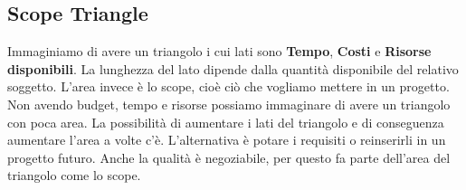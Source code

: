 \subsection{Scope Triangle}

Immaginiamo di avere un triangolo i cui lati sono \textbf{Tempo}, \textbf{Costi} e \textbf{Risorse disponibili}. La lunghezza del lato dipende dalla quantità disponibile del relativo soggetto. L'area invece è lo scope, cioè ciò che vogliamo mettere in un progetto. Non avendo budget, tempo e risorse possiamo immaginare di avere un triangolo con poca area.\newline
La possibilità di aumentare i lati del triangolo e di conseguenza aumentare l'area a volte c'è. L'alternativa è potare i requisiti o reinserirli in un progetto futuro. Anche la qualità è negoziabile, per questo fa parte dell'area del triangolo come lo scope.
